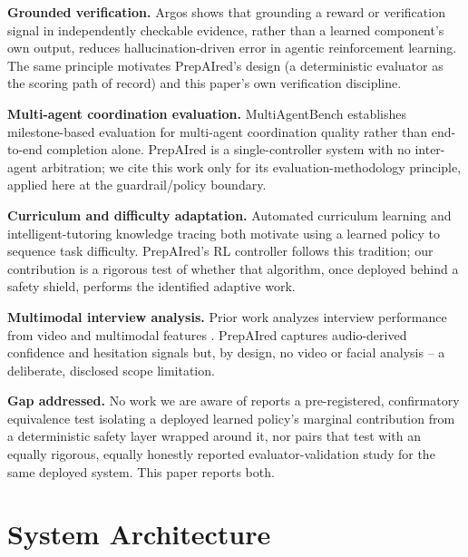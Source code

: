 \documentclass[conference]{IEEEtran}
\begin{document}
\textbf{Grounded verification.} Argos \cite{argos2026} shows that grounding a reward or verification signal in independently checkable evidence, rather than a learned component's own output, reduces hallucination-driven error in agentic reinforcement learning. The same principle motivates PrepAIred's design (a deterministic evaluator as the scoring path of record) and this paper's own verification discipline.

\textbf{Multi-agent coordination evaluation.} MultiAgentBench \cite{zhu2025} establishes milestone-based evaluation for multi-agent coordination quality rather than end-to-end completion alone. PrepAIred is a single-controller system with no inter-agent arbitration; we cite this work only for its evaluation-methodology principle, applied here at the guardrail/policy boundary.

\textbf{Curriculum and difficulty adaptation.} Automated curriculum learning \cite{graves2017,portelas2020} and intelligent-tutoring knowledge tracing \cite{anderson1995,corbett1994} both motivate using a learned policy to sequence task difficulty. PrepAIred's RL controller follows this tradition; our contribution is a rigorous test of whether that algorithm, once deployed behind a safety shield, performs the identified adaptive work.

\textbf{Multimodal interview analysis.} Prior work analyzes interview performance from video and multimodal features \cite{naim2015,chen2017}. PrepAIred captures audio-derived confidence and hesitation signals but, by design, no video or facial analysis -- a deliberate, disclosed scope limitation.

\textbf{Gap addressed.} No work we are aware of reports a pre-registered, confirmatory equivalence test isolating a deployed learned policy's marginal contribution from a deterministic safety layer wrapped around it, nor pairs that test with an equally rigorous, equally honestly reported evaluator-validation study for the same deployed system. This paper reports both.

\section{System Architecture}
\end{document}
